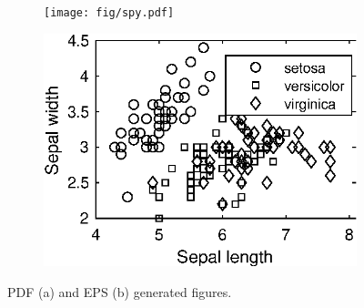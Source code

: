 	\begin{figure}[H]
		\centering
		\begin{subfigure}[b]{\subfigsz\textwidth} 
			\texttt{[image: fig/spy.pdf]}
		\end{subfigure}
		\hfil
		\begin{subfigure}[b]{\subfigsz\textwidth}
			\includegraphics{fig/gscatter.eps}
		\end{subfigure}
		\caption{PDF (a) and EPS (b) generated figures. \label{fig:math-stuff}}
	\end{figure}
